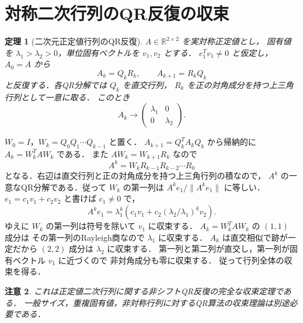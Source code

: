 \documentclass[a5paper,10pt,onecolumn]{jsarticle}
\makeatletter
\theoremstyle{mathnotetheorem}
\newtheorem{theorem}{定理}[section]
\newtheorem{remark}[theorem]{注意}
\renewcommand{\proofname}{証明}
\renewenvironment{proof}[1][\proofname]{%
  \par\pushQED{\qed}\normalfont\topsep4\p@\@plus2\p@\relax
  \trivlist\item[\hskip\labelsep\bfseries #1]\ignorespaces
}{\popQED\endtrivlist\@endpefalse}
\newcommand{\norm}[1]{\lVert #1\rVert}
\makeatother
\begin{document}
\section{対称二次行列のQR反復の収束}
\begin{theorem}[二次元正定値行列のQR反復]
$A\in\mathbb R^{2\times2}$ を実対称正定値とし，
固有値を $\lambda_1>\lambda_2>0$，単位固有ベクトルを $v_1,v_2$ とする．
$e_1^Tv_1\ne0$ と仮定し，$A_0=A$ から
\[
 A_k=Q_kR_k,\qquad A_{k+1}=R_kQ_k
\]
と反復する．各QR分解では $Q_k$ を直交行列，
$R_k$ を正の対角成分を持つ上三角行列として一意に取る．
このとき
\[
 A_k\longrightarrow
 \begin{pmatrix}\lambda_1&0\\0&\lambda_2\end{pmatrix}.
\]
\end{theorem}
\begin{proof}
$W_0=I$，$W_k=Q_0Q_1\cdots Q_{k-1}$ と置く．
$A_{k+1}=Q_k^TA_kQ_k$ から帰納的に
$A_k=W_k^TAW_k$ である．
また $A W_k=W_{k+1}R_k$ なので
\[
 A^k=W_kR_{k-1}R_{k-2}\cdots R_0
\]
となる．右辺は直交行列と正の対角成分を持つ上三角行列の積なので，
$A^k$ の一意なQR分解である．従って $W_k$ の第一列は
$A^ke_1/\norm{A^ke_1}$ に等しい．
$e_1=c_1v_1+c_2v_2$ と書けば $c_1\ne0$ で，
\[
 A^ke_1=\lambda_1^k
 \left(c_1v_1+c_2(\lambda_2/\lambda_1)^kv_2\right).
\]
ゆえに $W_k$ の第一列は符号を除いて $v_1$ に収束する．
$A_k=W_k^TAW_k$ の $(1,1)$ 成分は
その第一列のRayleigh商なので $\lambda_1$ に収束する．
$A_k$ は直交相似で跡が一定だから $(2,2)$ 成分は
$\lambda_2$ に収束する．
第一列と第二列が直交し，第一列が固有ベクトル $v_1$ に近づくので
非対角成分も零に収束する．
従って行列全体の収束を得る．
\end{proof}
\begin{remark}
これは正定値二次行列に関する非シフトQR反復の完全な収束定理である．
一般サイズ，重複固有値，非対称行列に対するQR算法の収束理論は別途必要である．
\end{remark}
\end{document}
